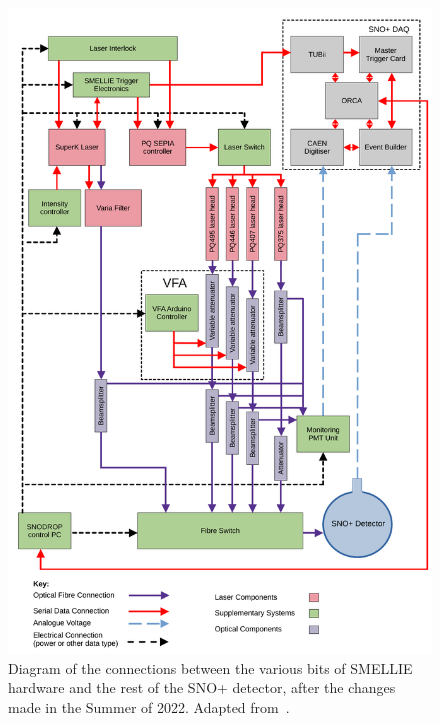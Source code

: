 \begin{figure}
    \centering
    \includegraphics[width=0.95\linewidth]{3_SMELLIEHardware/images/smellie_hardware_schematic.pdf}
    \caption[Diagram of the connections between the various bits of SMELLIE hardware and the rest of the SNO+ detector]
    {Diagram of the connections between the various bits of SMELLIE hardware and the rest of the SNO+ detector, after the changes made in the Summer of 2022. Adapted from~\cite{turnerMeasurementScatteringCharacteristics2022}.}
    \label{fig:smellie_diagram_detailed}
\end{figure}

